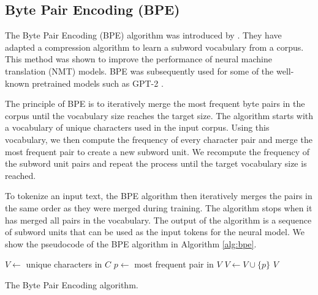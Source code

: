 

\subsection{Byte Pair Encoding (BPE)}

The Byte Pair Encoding (BPE) algorithm was introduced by \citet{sennrich_neural_2016}. They have adapted a compression algorithm \cite{gage_new_1994} to learn a subword vocabulary from a corpus. This method was shown to improve the performance of neural machine translation (NMT) models. BPE was subsequently used for some of the well-known pretrained models such as GPT-2 \citep{radford_improving_2018}.

The principle of BPE is to iteratively merge the most frequent byte pairs in the corpus until the vocabulary size reaches the target size. The algorithm starts with a vocabulary of unique characters used in the input corpus. Using this vocabulary, we then compute the frequency of every character pair and merge the most frequent pair to create a new subword unit. We recompute the frequency of the subword unit pairs and repeat the process until the target vocabulary size is reached.

To tokenize an input text, the BPE algorithm then iteratively merges the pairs in the same order as they were merged during training. The algorithm stops when it has merged all pairs in the vocabulary. The output of the algorithm is a sequence of subword units that can be used as the input tokens for the neural model. We show the pseudocode of the BPE algorithm in Algorithm \ref{alg:bpe}.

\begin{algorithm}
    \begin{algorithmic}
        \State $V \gets$ unique characters in $C$
        \State $p \gets$ most frequent pair in $V$
        \State $V \gets V \cup \{p\}$
        \EndWhile
        \State \Return $V$
        \EndFunction
    \end{algorithmic}
    \caption{The Byte Pair Encoding algorithm.}
    \label{alg:bpe}
\end{algorithm}

